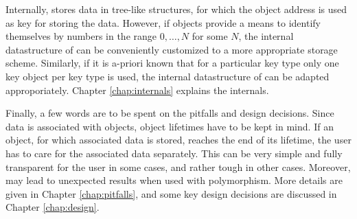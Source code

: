 Internally, {\ViennaData} stores data in tree-like structures, for which the object address is used as key for storing the data. 
However, if objects provide a means to identify themselves by numbers in the range $0, \ldots, N$ for some $N$, the internal datastructure of {\ViennaData} can be 
conveniently customized to a more appropriate storage scheme. Similarly, if it is a-priori known that for a particular key type only one key object per key type is used, the
internal datastructure of {\ViennaData} can be adapted approporiately. Chapter \ref{chap:internals} explains the internals.

Finally, a few words are to be spent on the pitfalls and design decisions. Since data is associated with objects, object lifetimes have to be kept in mind.
If an object, for which associated data is stored, reaches the end of its lifetime, the user has to care for the associated data separately.
This can be very simple and fully transparent for the user in some cases, and rather tough in other cases. Moreover, {\ViennaData} may lead to unexpected results when used with polymorphism. More details are given in Chapter \ref{chap:pitfalls}, and some key design decisions are discussed in Chapter \ref{chap:design}. 